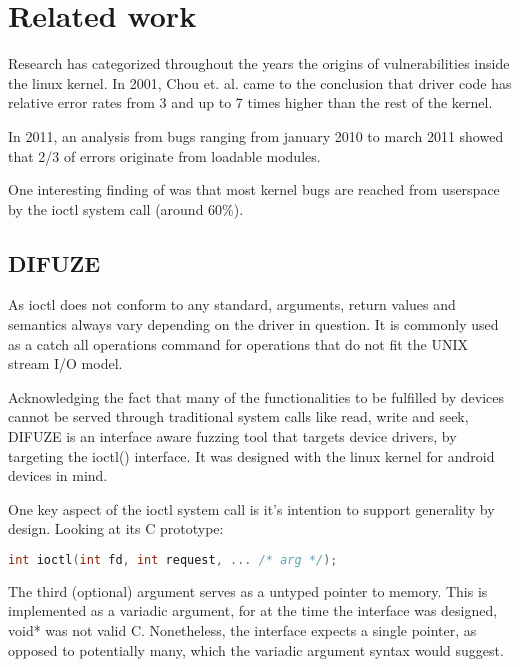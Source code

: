 \section{Related work}


Research has categorized throughout the years the origins of
vulnerabilities inside the linux kernel. In 2001,  Chou et. al.
came to the conclusion that driver code has relative error rates
from 3 and up to 7 times higher than the rest of the kernel\cite{chou2001}.

In 2011, an analysis from bugs ranging from january 2010 to march 2011
showed that 2/3 of errors originate from loadable modules\cite{chen2011}.

One interesting finding of \cite{android2014} was that most kernel bugs
are reached from userspace by the ioctl system call (around 60\%).


\subsection{DIFUZE}

As ioctl does not conform to any standard, arguments, return values and semantics always vary
depending on the driver in question. It is commonly used as a catch all operations command for
operations that do not fit the UNIX stream I/O model.

Acknowledging the fact that many of the functionalities to be fulfilled
by devices cannot be served through traditional system calls like read, write
and seek, DIFUZE is an interface aware fuzzing tool that targets
device drivers, by targeting the ioctl() interface\cite{difuze17}.
It was designed with the linux kernel for android devices in mind.


One key aspect of the ioctl system call is it's intention to support generality by design.
Looking at its C prototype:

\begin{lstlisting}[language=c]
  int ioctl(int fd, int request, ... /* arg */);
\end{lstlisting}

The third (optional) argument serves as a untyped pointer to memory. This is implemented as a variadic argument, for at the time
the interface was designed, void* was not valid C. Nonetheless, the interface expects a single pointer, as opposed to potentially
many, which the variadic argument syntax would suggest.

